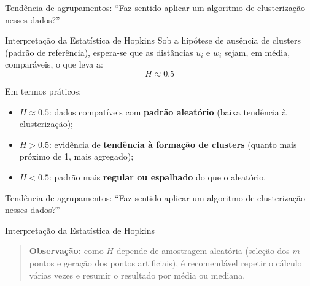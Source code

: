 \documentclass[
  ignorenonframetext,
  aspectratio=169,
]{beamer}
\providecommand{\tightlist}{%
  \setlength{\itemsep}{0pt}\setlength{\parskip}{0pt}}
\begin{document}
\begin{frame}{Tendência de agrupamentos: ``Faz sentido aplicar um
algoritmo de clusterização nesses dados?''}
\label{tenduxeancia-de-agrupamentos-faz-sentido-aplicar-um-algoritmo-de-clusterizauxe7uxe3o-nesses-dados-5}
\begin{block}{Interpretação da Estatística de Hopkins}
\label{interpretauxe7uxe3o-da-estatuxedstica-de-hopkins}
Sob a hipótese de ausência de clusters (padrão de referência), espera-se
que as distâncias \(u_i\) e \(w_i\) sejam, em média, comparáveis, o que
leva a: \[
H \approx 0.5
\]

Em termos práticos:

\begin{itemize}
\tightlist
\item
  \(H \approx 0.5\): dados compatíveis com \textbf{padrão aleatório}
  (baixa tendência à clusterização);
\item
  \(H > 0.5\): evidência de \textbf{tendência à formação de clusters}
  (quanto mais próximo de 1, mais agregado);
\item
  \(H < 0.5\): padrão mais \textbf{regular ou espalhado} do que o
  aleatório.
\end{itemize}
\end{block}
\end{frame}

\begin{frame}{Tendência de agrupamentos: ``Faz sentido aplicar um
algoritmo de clusterização nesses dados?''}
\label{tenduxeancia-de-agrupamentos-faz-sentido-aplicar-um-algoritmo-de-clusterizauxe7uxe3o-nesses-dados-6}
\begin{block}{Interpretação da Estatística de Hopkins}
\label{interpretauxe7uxe3o-da-estatuxedstica-de-hopkins-1}
\begin{quote}
\textbf{Observação:} como \(H\) depende de amostragem aleatória (seleção
dos \(m\) pontos e geração dos pontos artificiais), é recomendável
repetir o cálculo várias vezes e resumir o resultado por média ou
mediana.
\end{quote}
\end{block}
\end{frame}
\end{document}
